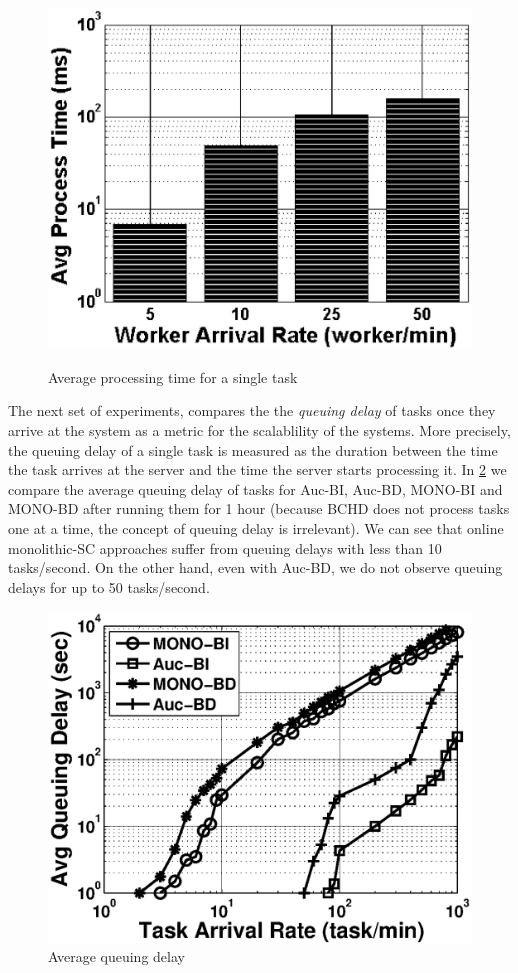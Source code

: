 \begin{figure}[h]
{        \label{fig:runtime_bchd}
        \includegraphics[width = 0.45\columnwidth]{figures/run_time_bchd.eps}
    }
    \vspace{-0.15in}
    \caption{Average processing time for a single task}
    \label{fig:runtime}
\end{figure}

The next set of experiments, compares the the \emph{queuing delay} of tasks \cite{Wu06} once they arrive at the system as a metric for the scalablility of the systems. More precisely, the queuing delay of a single task is measured as the duration between the time the task arrives at the server and the time the server starts processing it. In \cref{fig:queue} we compare the average queuing delay of tasks for Auc-BI, Auc-BD, MONO-BI and MONO-BD after running them for 1 hour (because BCHD does not process tasks one at a time, the concept of queuing delay is irrelevant). We can see that online monolithic-SC approaches suffer from queuing delays with less than 10 tasks/second. On the other hand, even with Auc-BD, we do not observe queuing delays for up to 50 tasks/second.

\begin{figure}[h]
	\centering
	\includegraphics[width = 0.75\columnwidth]{figures/queue.eps}
	\vspace{-0.1in}
	\caption{Average queuing delay}\label{fig:queue}
\end{figure}


